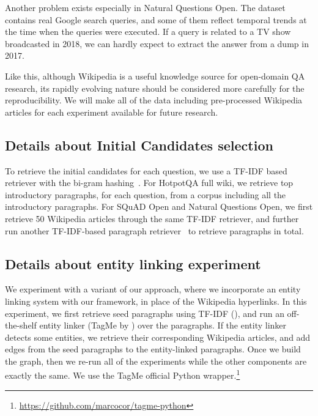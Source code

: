 \documentclass{article} \usepackage{iclr2020_conference,times}
\begin{document}
Another problem exists especially in Natural Questions Open.
The dataset contains real Google search queries, and some of them reflect temporal trends at the time when the queries were executed.
If a query is related to a TV show broadcasted in 2018, we can hardly expect to extract the answer from a dump in 2017.


Like this, although Wikipedia is a useful knowledge source for open-domain QA research, its rapidly evolving nature should be considered more carefully for the reproducibility. We will make all of the data including pre-processed Wikipedia articles for each experiment available for future research. 


\subsection{Details about Initial Candidates  selection}
\label{sec:retireval_details}
To retrieve the initial candidates  for each question, we use a TF-IDF based retriever with the bi-gram hashing~\citep{chen2017reading}.
For HotpotQA full wiki, we retrieve top  introductory paragraphs, for each question, from a corpus including all the introductory paragraphs.
For SQuAD Open and Natural Questions Open, we first retrieve 50 Wikipedia articles through the same TF-IDF retriever, and further run another TF-IDF-based paragraph retriever~\citep{clark-gardner-2018-simple,min2019discrete} to retrieve  paragraphs in total.

\subsection{Details about entity linking experiment}
\label{subsec:appendix_entity_linking}

We experiment with a variant of our approach, where we incorporate an entity linking system with our framework, in place of the Wikipedia hyperlinks. 
In this experiment, we first retrieve seed paragraphs using TF-IDF (), and run an off-the-shelf entity linker (TagMe by \cite{ferragina2011fast}) over the paragraphs. If the entity linker detects some entities, we retrieve their corresponding Wikipedia articles, and add edges from the seed paragraphs to the entity-linked paragraphs.
Once we build the graph, then we re-run all of the experiments while the other components are exactly the same. 
We use the TagMe official Python wrapper.\footnote{\url{https://github.com/marcocor/tagme-python}}
\end{document}
